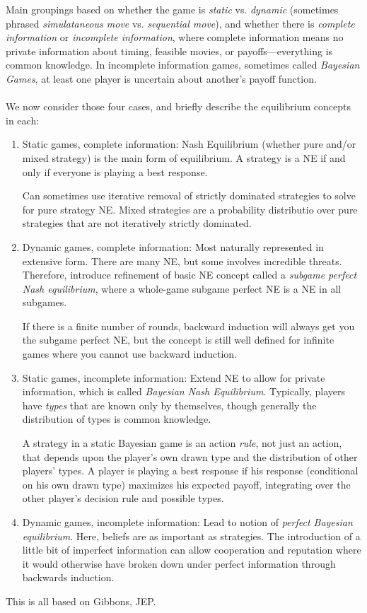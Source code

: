 \documentclass[12pt]{article}
\theoremstyle{plain}
\theoremstyle{definition}
\theoremstyle{remark}
\begin{document}
Main groupings based on whether the game is \emph{static} vs.
\emph{dynamic} (sometimes phrased \emph{simulataneous move} vs.
\emph{sequential move}), and whether there is
\emph{complete information} or \emph{incomplete information}, where
complete information means no private information about timing, feasible
movies, or payoffs---everything is common knowledge.
In incomplete information games, sometimes called \emph{Bayesian Games},
at least one player is uncertain about another's payoff function.
\\
\\
We now consider those four cases, and briefly describe the equilibrium
concepts in each:
\begin{enumerate}
  \item Static games, complete information: Nash Equilibrium (whether
    pure and/or mixed strategy) is the main form of equilibrium.
    A strategy is a NE if and only if everyone is playing a best
    response.

    Can sometimes use iterative removal of strictly dominated strategies
    to solve for pure strategy NE. Mixed strategies are a probability
    distributio over pure strategies that are not iteratively strictly
    dominated.

  \item Dynamic games, complete information: Most naturally
    represented in extensive form. There are many NE, but some involves
    incredible threats. Therefore, introduce refinement of basic NE
    concept called a \emph{subgame perfect Nash equilibrium},
    where a whole-game subgame perfect NE is a NE in all subgames.

    If there is a finite number of rounds, backward induction will
    always get you the subgame perfect NE, but the concept is still well
    defined for infinite games where you cannot use backward induction.

  \item Static games, incomplete information: Extend NE to allow for
    private information, which is called
    \emph{Bayesian Nash Equilibrium}.
    Typically, players have \emph{types} that are known only by
    themselves, though generally the distribution of types is common
    knowledge.

    A strategy in a static Bayesian game is an action \emph{rule}, not
    just an action, that depends upon the player's own drawn type and
    the distribution of other players' types.
    A player is playing a best response if his response (conditional on
    his own drawn type) maximizes his expected payoff, integrating over
    the other player's decision rule and possible types.

  \item Dynamic games, incomplete information: Lead to notion of
    \emph{perfect Bayesian equilibrium}.
    Here, beliefs are as important as strategies.
    The introduction of a little bit of imperfect information can allow
    cooperation and reputation where it would otherwise have broken down
    under perfect information through backwards induction.
\end{enumerate}
This is all based on Gibbons, JEP.
\end{document}
